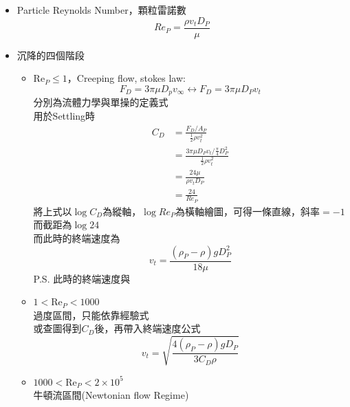 \documentclass[../main.tex]{subfiles}
\begin{document}
\begin{itemize}
  \begin{equation}
    \frac{d}{dt}(mv) = = F_g + F_b - F_D
  \end{equation}
  其餘同沉降\\
  最後會得到終端速率:
  \begin{equation}
    v_t = \sqrt{\frac{4(\rho - \rho_p)\cdot g D_P}{3C_D\rho}}
  \end{equation}
  \item Particle Reynolds Number，顆粒雷諾數
  \begin{equation}
    Re_P = \frac{\rho v_t D_P}{\mu}
  \end{equation}
  \item 沉降的四個階段
  \begin{itemize}
    \item $\boxed{\text{Re}_P\leq 1}$，Creeping flow, stokes law:
    \begin{equation}
      F_D = 3\pi \mu D_p v_\infty \leftrightarrow  F_D = 3\pi \mu D_P v_t
    \end{equation}
    分別為流體力學與單操的定義式\\
    用於Settling時
    \begin{align}
      C_D &= \frac{F_D/A_P}{\frac{1}{2}\rho v_t^2} \nonumber\\
      &= \frac{3\pi \mu D_P v_t/\frac{\pi}{4}D_P^2}{\frac{1}{2}\rho v_t^2} \nonumber\\
      &= \frac{24\mu}{\rho v_t D_P} \nonumber\\
      &= \frac{24}{Re_P}
    \end{align}
    將上式以$\log C_D$為縱軸，$\log Re_P$為橫軸繪圖，可得一條直線，斜率$=-1$\\
    而截距為$\log 24$\\
    而此時的終端速度為
    \begin{equation}
      v_t = \frac{(\rho_P - \rho)g D_P^2}{18\mu}
    \end{equation}
    P.S. 此時的終端速度與
    \item $\boxed{1 < \text{Re}_P < 1000}$\\
    過度區間，只能依靠經驗式\\
    或查圖得到$C_D$後，再帶入終端速度公式
    \begin{equation}
      v_t = \sqrt{\frac{4(\rho_P - \rho)g D_P}{3 C_D \rho}}
    \end{equation}
    \item $\boxed{1000 < \text{Re}_P < 2\times 10^5}$\\
    牛頓流區間(Newtonian flow Regime)

\end{itemize}
\end{itemize}
\end{document}
